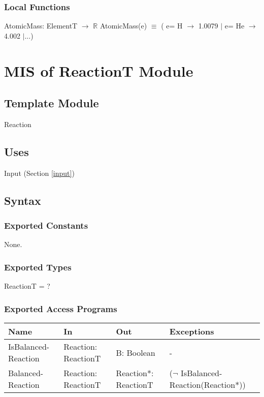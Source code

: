 \documentclass[12pt, titlepage]{article}
\begin{document}
\subsubsection{Local Functions}
AtomicMass: ElementT $\rightarrow$ $\mathbb{R}$ 
\newline
AtomicMass(e) $\equiv$ ( e= H $\rightarrow$ 1.0079 $\vert$  e= He $\rightarrow$ 4.002 $\vert$...)  

\newpage


\section{MIS of ReactionT Module} \label{Reaction} 

\subsection{Template Module}

Reaction

\subsection{Uses}

 Input (Section \ref{input})

\subsection{Syntax}

\subsubsection{Exported Constants}

None.

\subsubsection{Exported Types}

ReactionT = ?

\subsubsection{Exported Access Programs}

\begin{center}
\begin{tabular}{p{2cm} p{4cm} p{4cm} p{2cm}}
\hline
\textbf{Name} & \textbf{In} & \textbf{Out} & \textbf{Exceptions} \\
\hline
{IsBalanced-Reaction} & Reaction: \newline ReactionT &  B: Boolean  & - \\
\hline
{Balanced-Reaction} & Reaction: \newline ReactionT &  Reaction*: \newline ReactionT  &  ($\neg$ IsBalanced-Reaction(Reaction*))\\
\hline
\end{tabular}
\end{center}
\end{document}
